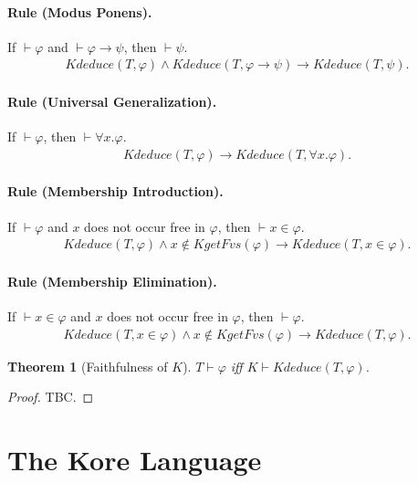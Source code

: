 \documentclass[UTF8]{article}
\newcounter{thmcounter}
\theoremstyle{plain}
\newtheorem{theorem}[thmcounter]{Theorem}
\theoremstyle{definition}
\theoremstyle{remark}
\newcommand{\kimplies}{\to}
\newcommand{\kforall}{\forall}
\newcommand{\kin}{\in}
\newcommand{\KgetFvs}{\mathit{KgetFvs}}
\newcommand{\Kdeduce}{\mathit{Kdeduce}}
\begin{document}
\paragraph{Rule (Modus Ponens).}
If $\vdash \varphi$ and $\vdash \varphi \to \psi$, then $\vdash \psi$.
\begin{align*}
\Kdeduce(T, \varphi) \wedge \Kdeduce(T, \varphi \kimplies \psi) \to \Kdeduce(T, \psi).
\end{align*}

\paragraph{Rule (Universal Generalization).}
If $\vdash \varphi$, then $\vdash \forall x . \varphi$.
\begin{align*}
\Kdeduce(T, \varphi) \to \Kdeduce(T, \kforall x . \varphi).
\end{align*}

\paragraph{Rule (Membership Introduction).}
If $\vdash \varphi$ and $x$ does not occur free in $\varphi$, then $\vdash x \in \varphi$.
\begin{align*}
\Kdeduce(T, \varphi) \wedge x \not\in \KgetFvs(\varphi) \to \Kdeduce(T, x \kin \varphi).
\end{align*}

\paragraph{Rule (Membership Elimination).}
If $\vdash x \in \varphi$ and $x$ does not occur free in $\varphi$, then $\vdash \varphi$.
\begin{align*}
\Kdeduce(T, x \kin \varphi) \wedge x \not\in \KgetFvs(\varphi) \to \Kdeduce(T, \varphi).
\end{align*}

\begin{theorem}[Faithfulness of $K$]
	$T \vdash \varphi$ iff $K \vdash \Kdeduce(T, \varphi)$.
\end{theorem}
\begin{proof}
	TBC.
\end{proof}

\section{The Kore Language}
\end{document}
